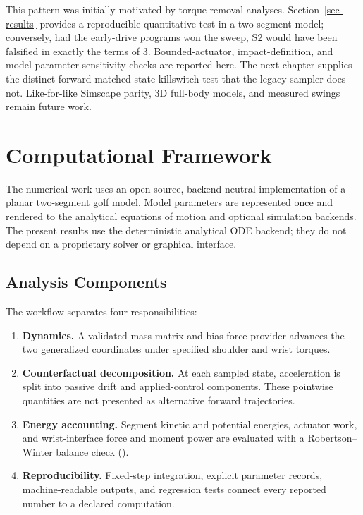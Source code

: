 \documentclass[
  letterpaper,
]{report}
\providecommand{\tightlist}{%
  \setlength{\itemsep}{0pt}\setlength{\parskip}{0pt}}
\begin{document}
This pattern was initially motivated by torque-removal analyses.
Section~\ref{sec-results} provides a reproducible quantitative test in a
two-segment model; conversely, had the early-drive programs won the
sweep, S2 would have been falsified in exactly the terms of 3.
Bounded-actuator, impact-definition, and model-parameter sensitivity
checks are reported here. The next chapter supplies the distinct forward
matched-state killswitch test that the legacy sampler does not.
Like-for-like Simscape parity, 3D full-body models, and measured swings
remain future work.

\chapter{Computational Framework}\label{sec-platform}

The numerical work uses an open-source, backend-neutral implementation
of a planar two-segment golf model. Model parameters are represented
once and rendered to the analytical equations of motion and optional
simulation backends. The present results use the deterministic
analytical ODE backend; they do not depend on a proprietary solver or
graphical interface.

\section{Analysis Components}\label{analysis-components}

The workflow separates four responsibilities:

\begin{enumerate}
\def\labelenumi{\arabic{enumi}.}
\tightlist
\item
  \textbf{Dynamics.} A validated mass matrix and bias-force provider
  advances the two generalized coordinates under specified shoulder and
  wrist torques.
\item
  \textbf{Counterfactual decomposition.} At each sampled state,
  acceleration is split into passive drift and applied-control
  components. These pointwise quantities are not presented as
  alternative forward trajectories.
\item
  \textbf{Energy accounting.} Segment kinetic and potential energies,
  actuator work, and wrist-interface force and moment power are
  evaluated with a Robertson--Winter balance check
  ().
\item
  \textbf{Reproducibility.} Fixed-step integration, explicit parameter
  records, machine-readable outputs, and regression tests connect every
  reported number to a declared computation.
\end{enumerate}
\end{document}
